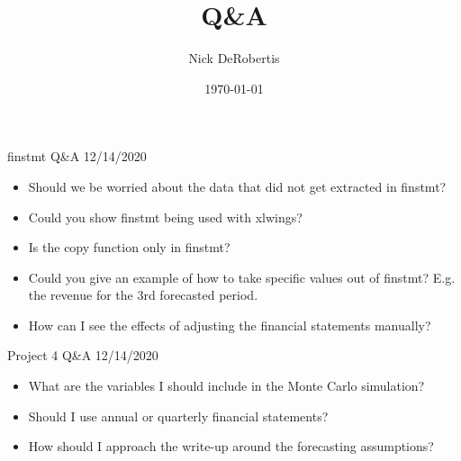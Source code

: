 \documentclass[]{article}
\begin{document}
\title{Q\&A}
\author{Nick DeRobertis}
\date{\today}
\maketitle
\begin{section}{finstmt Q\&A 12/14/2020}
\begin{itemize}
\item Should we be worried about the data that did not get extracted in finstmt?
\item Could you show finstmt being used with xlwings?
\item Is the copy function only in finstmt?
\item Could you give an example of how to take specific values out of finstmt? E.g. the revenue for the 3rd forecasted period.
\item How can I see the effects of adjusting the financial statements manually?
\end{itemize}
\end{section}
\begin{section}{Project 4 Q\&A 12/14/2020}
\begin{itemize}
\item What are the variables I should include in the Monte Carlo simulation?
\item Should I use annual or quarterly financial statements?
\item How should I approach the write-up around the forecasting assumptions?
\end{itemize}
\end{section}
\end{document}
